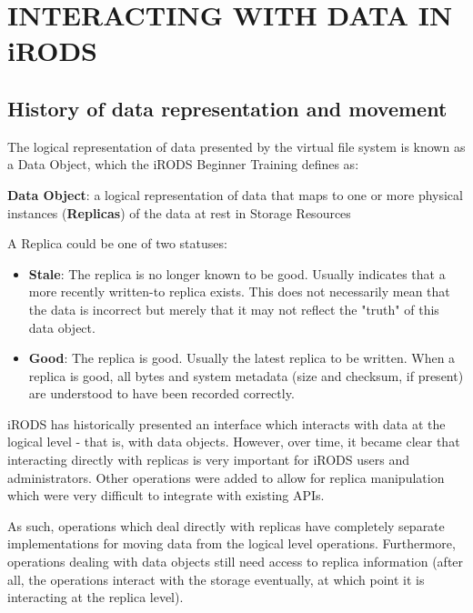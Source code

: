 \documentclass{irodsugm}
\begin{document}
\section*{INTERACTING WITH DATA IN iRODS}

\subsection*{History of data representation and movement}

The logical representation of data presented by the virtual file system is known as a Data Object, which the iRODS Beginner Training\cite{beginnertraining} defines as:

\begin{displayquote}
\textbf{Data Object}: a logical representation of data that maps to one or more physical instances (\textbf{Replicas}) of the data at rest in Storage Resources
\end{displayquote}

A Replica could be one of two statuses:

\begin{itemize}
\item \textbf{Stale}: The replica is no longer known to be good. Usually indicates that a more recently written-to replica exists. This does not necessarily mean that the data is incorrect but merely that it may not reflect the "truth" of this data object.
\item \textbf{Good}: The replica is good. Usually the latest replica to be written. When a replica is good, all bytes and system metadata (size and checksum, if present) are understood to have been recorded correctly.
\end{itemize}

iRODS has historically presented an interface which interacts with data at the logical level - that is, with data objects. However, over time, it became clear that interacting directly with replicas is very important for iRODS users and administrators. Other operations were added to allow for replica manipulation which were very difficult to integrate with existing APIs.

As such, operations which deal directly with replicas have completely separate implementations for moving data from the logical level operations. Furthermore, operations dealing with data objects still need access to replica information (after all, the operations interact with the storage eventually, at which point it is interacting at the replica level). 
\end{document}

